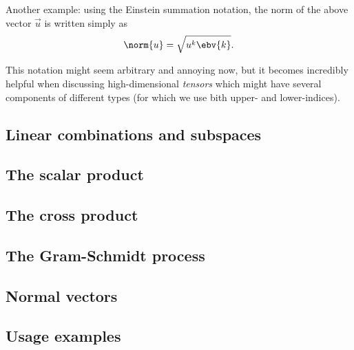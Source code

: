 Another example: using the Einstein summation notation, the norm of the above vector $\vec{u}$ is written simply as
\begin{equation}
  \norm{u} = \sqrt{u^{k}\ebv{k}}.
  \label{eq:Einstein_notation_norm_Rn}
\end{equation}

This notation might seem arbitrary and annoying now, but it becomes incredibly helpful when discussing high-dimensional \emph{tensors} which might have several components of different types (for which we use bith upper- and lower-indices).


\subsection{Linear combinations and subspaces}
\subsection{The scalar product}
\subsection{The cross product}
\subsection{The Gram-Schmidt process}
\subsection{Normal vectors}
\subsection{Usage examples}
